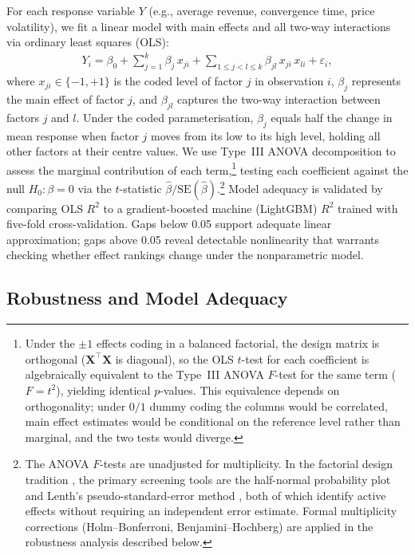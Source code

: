 For each response variable $Y$ (e.g., average revenue, convergence time, price volatility), we fit a linear model with main effects and all two-way interactions via ordinary least squares (OLS):
\begin{align}
  Y_i = \beta_0 + \sum_{j=1}^{k} \beta_j\, x_{ji} + \sum_{1 \le j < l \le k} \beta_{jl}\, x_{ji}\, x_{li} + \varepsilon_i,
  \label{eq:ols}
\end{align}
where $x_{ji} \in \{-1, +1\}$ is the coded level of factor $j$ in observation $i$, $\beta_j$ represents the main effect of factor $j$, and $\beta_{jl}$ captures the two-way interaction between factors $j$ and $l$. Under the coded parameterisation, $\beta_j$ equals half the change in mean response when factor $j$ moves from its low to its high level, holding all other factors at their centre values. We use Type~III ANOVA decomposition to assess the marginal contribution of each term,\footnote{Under the $\pm 1$ effects coding in a balanced factorial, the design matrix is orthogonal ($\mathbf{X}^\top\mathbf{X}$ is diagonal), so the OLS $t$-test for each coefficient is algebraically equivalent to the Type~III ANOVA $F$-test for the same term ($F = t^2$), yielding identical $p$-values. This equivalence depends on orthogonality; under $0/1$ dummy coding the columns would be correlated, main effect estimates would be conditional on the reference level rather than marginal, and the two tests would diverge.} testing each coefficient against the null $H_0\!: \beta = 0$ via the $t$-statistic $\hat{\beta}/\text{SE}(\hat{\beta})$.\footnote{The ANOVA $F$-tests are unadjusted for multiplicity. In the factorial design tradition \citep{Box2005}, the primary screening tools are the half-normal probability plot and Lenth's pseudo-standard-error method \citep{Lenth1989}, both of which identify active effects without requiring an independent error estimate. Formal multiplicity corrections (Holm--Bonferroni, Benjamini--Hochberg) are applied in the robustness analysis described below.} Model adequacy is validated by comparing OLS $R^2$ to a gradient-boosted machine (LightGBM) $R^2$ trained with five-fold cross-validation. Gaps below 0.05 support adequate linear approximation; gaps above 0.05 reveal detectable nonlinearity that warrants checking whether effect rankings change under the nonparametric model.

\subsection{Robustness and Model Adequacy}

